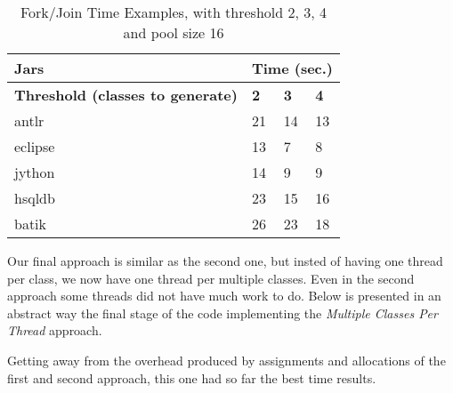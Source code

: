 \documentclass{dithesis}
\begin{document}
		\begin{table}[H]
			\centering
\begin{tabular}{@{}l|lll@{}}
\toprule
\textbf{Jars}    	& \multicolumn{3}{l}{\textbf{Time (sec.)}}  \\ \midrule
\textbf{Threshold (classes to generate)} 	& \textbf{2}  & \textbf{3}  & \textbf{4}  \\ \midrule
antlr            	& 21          & 14           & 13           \\
eclipse          	& 13          & 7            & 8            \\
jython           	& 14          & 9            & 9            \\
hsqldb           	& 23          & 15           & 16           \\
batik            	& 26          & 23           & 18           \\ \bottomrule
\end{tabular}
			\caption{Fork/Join Time Examples, with threshold 2, 3, 4 and pool size 16}
		\end{table}


        Our final approach is similar as the second one, but insted of having one thread per class, we now have one thread per multiple classes. Even in the second approach some threads did not have much work to do. Below is presented in an abstract way the final stage of the code implementing the \textit{Multiple Classes Per Thread} approach.

        Getting away from the overhead produced by assignments and allocations of the first and second approach, this one had so far the best time results.
\end{document}
